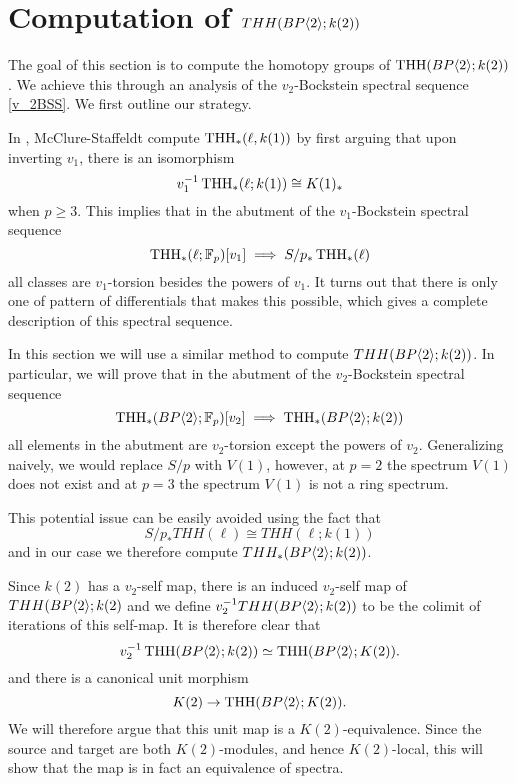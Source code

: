 
\section{Computation of $THH(BP\langle 2 \rangle;k(2))$}
The goal of this section is to compute the homotopy groups of $\operatorname{THH}(BP\langle 2 \rangle; k(2))$. We achieve this through an analysis of the $v_2$-Bockstein spectral sequence \eqref{v_2BSS}. We first outline our strategy. 

In \cites{McClureStaffeldt}, McClure-Staffeldt compute $\operatorname{THH}_*(\ell, k(1))$ by first arguing that upon inverting $v_1$, there is an isomorphism
\begin{equation}\label{eqn:THH(ell;K(1))}
	v_1^{-1}\operatorname{THH}_*(\ell;k(1))\cong K(1)_*
\end{equation}
when $p\ge 3$.
This implies that in the abutment of the $v_1$-Bockstein spectral sequence
\[
\operatorname{THH}_*(\ell;\mathbb{F}_p)[v_1]\implies S/p_*\operatorname{THH}_*(\ell)
\]
all classes are $v_1$-torsion besides the powers of $v_1$. It turns out that there is only one of pattern of differentials that makes this possible, which gives a complete description of this spectral sequence.

In this section we will use a similar method to compute $THH(BP\langle 2 \rangle;k(2))$. In particular, we will prove that in the abutment of the $v_2$-Bockstein spectral sequence 
\[
\operatorname{THH}_*(BP\langle 2 \rangle;\mathbb{F}_p)[v_2]\implies \operatorname{THH}_*(BP\langle 2 \rangle; k(2))
\]
all elements in the abutment are $v_2$-torsion except the powers of $v_2$. Generalizing naively, we would replace $S/p$ with $V(1)$, however, at $p=2$ the spectrum $V(1)$ does not exist and at $p=3$ the spectrum $V(1)$ is not a ring spectrum. 

This potential issue can be easily avoided using the fact that 
\[ S/p_*THH(\ell)\cong THH(\ell;k(1))\]
and in our case we therefore compute $THH_*(BP\langle 2 \rangle;k(2))$. 

Since $k(2)$ has a $v_2$-self map, there is an induced $v_2$-self map of $THH(BP\langle 2 \rangle;k(2)$ and we define 
$v_2^{-1}THH(BP\langle 2 \rangle;k(2))$
to be the colimit of iterations of this self-map. It is therefore clear that 
\[
v_2^{-1}\operatorname{THH}(BP\langle 2 \rangle;k(2))\simeq \operatorname{THH}(BP\langle 2 \rangle;K(2)). 
\]
and there is a canonical unit morphism 
\[
K(2)\to \operatorname{THH}(BP\langle 2 \rangle;K(2)). 
\]
We will therefore argue that this unit map is a $K(2)$-equivalence. Since the source and target are both $K(2)$-modules, and hence $K(2)$-local, this will show that the map is in fact an equivalence of spectra.

